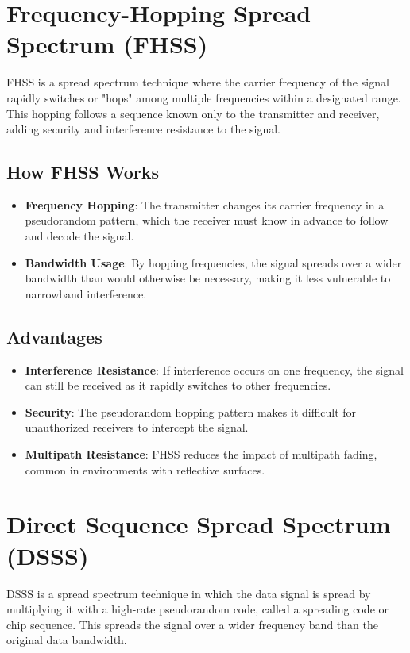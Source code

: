 \documentclass[12pt,a4paper]{article}
\begin{document}
\section{Frequency-Hopping Spread Spectrum (FHSS)}
FHSS is a spread spectrum technique where the carrier frequency of the signal rapidly switches or "hops" among multiple frequencies within a designated range. This hopping follows a sequence known only to the transmitter and receiver, adding security and interference resistance to the signal.

\subsection{How FHSS Works}
\begin{itemize}
    \item \textbf{Frequency Hopping}: The transmitter changes its carrier frequency in a pseudorandom pattern, which the receiver must know in advance to follow and decode the signal.
    \item \textbf{Bandwidth Usage}: By hopping frequencies, the signal spreads over a wider bandwidth than would otherwise be necessary, making it less vulnerable to narrowband interference.
\end{itemize}

\subsection{Advantages}
\begin{itemize}
    \item \textbf{Interference Resistance}: If interference occurs on one frequency, the signal can still be received as it rapidly switches to other frequencies.
    \item \textbf{Security}: The pseudorandom hopping pattern makes it difficult for unauthorized receivers to intercept the signal.
    \item \textbf{Multipath Resistance}: FHSS reduces the impact of multipath fading, common in environments with reflective surfaces.
\end{itemize}

\section{Direct Sequence Spread Spectrum (DSSS)}
DSSS is a spread spectrum technique in which the data signal is spread by multiplying it with a high-rate pseudorandom code, called a spreading code or chip sequence. This spreads the signal over a wider frequency band than the original data bandwidth.
\end{document}
